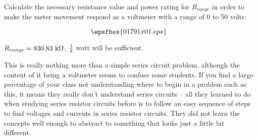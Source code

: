 

Calculate the necessary resistance value and power rating for $R_{range}$ in order to make the meter movement respond as a voltmeter with a range of 0 to 50 volts:

$$\epsfbox{01791x01.eps}$$







$R_{range} = 830.83 \hbox{ k} \Omega$, $1 \over 8$ watt will be sufficient.







This is really nothing more than a simple series circuit problem, although the context of it being a voltmeter seems to confuse some students.  If you find a large percentage of your class not understanding where to begin in a problem such as this, it means they really don't understand series circuits -- all they learned to do when studying series resistor circuits before is to follow an easy sequence of steps to find voltages and currents in series resistor circuits.  They did not learn the concepts well enough to abstract to something that looks just a little bit different.




